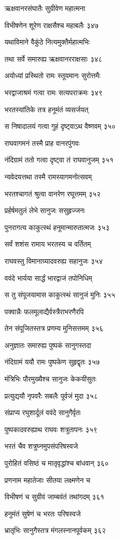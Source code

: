 ऋक्षवानरसंघातैः सुग्रीवेण महात्मना

विभीषणेन शूरेण राक्षसैश्च महाबलैः ३४७

यथाविमाने वैकुंठे नित्यमुक्तैर्महात्मभिः

तथा सर्वे समारुह्य ऋक्षवानरराक्षसाः ३४८

अयोध्यां प्रस्थितो रामः स्तूयमानः सुरोत्तमैः

भरद्वाजाश्रमं गत्वा रामः सत्यपराक्रमः ३४९

भरतस्यांतिके तत्र हनूमंतं व्यसर्जयत्

स निषादालयं गत्वा गुहं दृष्ट्वाऽथ वैष्णवम् ३५०

राघवागमनं तस्मै प्राह वानरपुंगवः

नंदिग्रामं ततो गत्वा दृष्ट्वा तं राघवानुजम् ३५१

न्यवेदयत्तथा तस्मै रामस्यागमनोत्सवम्

भरतश्चागतं श्रुत्वा वानरेण रघूत्तमम् ३५२

प्रर्हर्षमतुलं लेभे सानुजः ससुहृज्जनः

पुनरागत्य काकुत्स्थं हनूमान्मारुतात्मजः ३५३

सर्वं शशंस रामाय भरतस्य च वर्तितम्

राघवस्तु विमानाग्र्यादवरुह्य सहानुजः ३५४

ववंदे भार्यया सार्द्धं भारद्वाजं तपोनिधिम्

स तु संपूजयामास काकुत्स्थं सानुजं मुनिः ३५५

पक्वान्नैः फलमूलाद्यैर्वस्त्रैराभरणैरपि

तेन संपूजितस्तत्र प्रणम्य मुनिसत्तमम् ३५६

अनुज्ञातः समारुह्य पुष्पकं सानुगस्तदा

नंदिग्रामं ययौ रामः पुष्पकेण सुहृद्वृतः ३५७

मंत्रिभिः पौरमुख्यैश्च सानुजः केकयीसुतः

प्रत्युद्ययौ नृपवरैः सबलैः पूर्वजं मुदा ३५८

संप्राप्य रघुशार्दूलं ववंदे सानुगैर्वृतः

पुष्पकादवरुह्याथ राघवः शत्रुतापनः ३५९

भरतं चैव शत्रुघ्नमुपसंपरिषस्वजे

पुरोहितं वसिष्ठं च मातृवृद्धांश्च बांधवान् ३६०

प्रणनाम महातेजाः सीतया लक्ष्मणेन च

विभीषणं च सुग्रीवं जाम्बवंतं तथांगदम् ३६१

हनुमंतं सुषेणं च भरतः परिषस्वजे

भ्रातृभिः सानुगैस्तत्र मंगलस्नानपूर्वकम् ३६२

